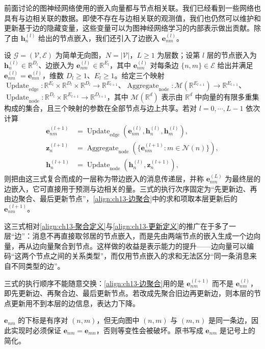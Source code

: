 \documentclass[../../main.tex]{subfiles}
\begin{document}
前面讨论的图神经网络使用的嵌入向量都与节点相关联。我们已经看到一些网络也具有与边相关联的数据。即使不存在与边相关联的观测值，我们也仍然可以维护和更新基于边的隐藏变量，这些变量可以为图神经网络学习的内部表示做出贡献。除了由 $\bm{h}_n^{(l)}$ 给出的节点嵌入，我们还引入了边嵌入 $\bm{e}_{nm}^{(l)}$。

\begin{definition}[带边嵌入的消息传递]\label{definition:ch13-边嵌入消息传递}
设 $\mathcal{G}=(\mathcal{V},\mathcal{E})$ 为简单无向图，$N=|\mathcal{V}|$，$L\geqslant1$ 为层数；设第 $l$ 层的节点嵌入为 $\bm{h}_n^{(l)}\in\mathbb{R}^{D_l}$、边嵌入为 $\bm{e}_{nm}^{(l)}\in\mathbb{R}^{E_l}$，其中 $\bm{e}_{nm}^{(l)}$ 对每条边 $\{n,m\}\in\mathcal{E}$ 给出并满足 $\bm{e}_{nm}^{(l)}=\bm{e}_{mn}^{(l)}$，维数 $D_l\geqslant1$、$E_l\geqslant1$。给定三个映射 $\operatorname{Update}_{\mathrm{edge}}:\mathbb{R}^{E_l}\times\mathbb{R}^{D_l}\times\mathbb{R}^{D_l}\to\mathbb{R}^{E_{l+1}}$、$\operatorname{Aggregate}_{\mathrm{node}}:\mathcal{M}(\mathbb{R}^{E_{l+1}})\to\mathbb{R}^{E_{l+1}}$、$\operatorname{Update}_{\mathrm{node}}:\mathbb{R}^{D_l}\times\mathbb{R}^{E_{l+1}}\to\mathbb{R}^{D_{l+1}}$，其中 $\mathcal{M}(\mathbb{R}^{d})$ 表示由 $\mathbb{R}^{d}$ 中向量的有限多重集构成的集合，且三个映射的参数在全部节点与边上共享。若对 $l=0,\cdots,L-1$ 依次计算
\begin{align}
\bm{e}_{nm}^{(l+1)}&=\operatorname{Update}_{\mathrm{edge}}\!\left(\bm{e}_{nm}^{(l)},\bm{h}_n^{(l)},\bm{h}_m^{(l)}\right),
\label{align:ch13-边更新}\\
\bm{z}_n^{(l+1)}&=\operatorname{Aggregate}_{\mathrm{node}}\!\left(\{\bm{e}_{nm}^{(l+1)}:m\in\mathcal{N}(n)\}\right),
\label{align:ch13-边聚合}\\
\bm{h}_n^{(l+1)}&=\operatorname{Update}_{\mathrm{node}}\!\left(\bm{h}_n^{(l)},\bm{z}_n^{(l+1)}\right),
\label{align:ch13-边节点更新}
\end{align}
则把由这三式复合而成的一层称为带边嵌入的消息传递层，并称 $\bm{e}_{nm}^{(L)}$ 为最终层的边嵌入，它可直接用于预测与边相关的量。三式的执行次序固定为“先更新边、再由边聚合、最后更新节点”，\eqref{align:ch13-边聚合}中的求和项取本层更新后的 $\bm{e}_{nm}^{(l+1)}$。
\end{definition}

\begin{remark}
这三式相对\eqref{align:ch13-聚合定义}与\eqref{align:ch13-更新定义}的推广在于多了一层“边”：消息不再直接取邻居的节点嵌入，而是先由两端节点的嵌入生成一个边向量，再从边向量聚合到节点。这样做的收益是表示能力的提升——边向量可以编码“这两个节点之间的关系类型”，而仅用节点嵌入的求和无法区分“同一条消息来自不同类型的边”。\par
三式的执行顺序不能随意交换：\eqref{align:ch13-边聚合}用的是 $\bm{e}_{nm}^{(l+1)}$ 而不是 $\bm{e}_{nm}^{(l)}$，即先更新边、再聚合边、最后更新节点。若改成先聚合旧边再更新边，则本层的节点更新用不到本层的边信息，表达力下降。\par
$\bm{e}_{nm}$ 的下标是有序对 $(n,m)$，但无向图中 $(n,m)$ 与 $(m,n)$ 是同一条边，因此实现时必须保证 $\bm{e}_{nm}=\bm{e}_{mn}$，否则等变性会被破坏。原书写成 $\bm{e}_{nm}$ 是记号上的简化。
\end{remark}
\end{document}
